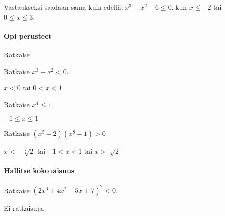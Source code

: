 Vastaukseksi saadaan sama kuin edellä: $x^3-x^2-6 \leq 0$, kun $x\leq -2$ tai $0\leq x \leq 3$.

\begin{tehtavasivu}

\paragraph*{Opi perusteet}

\begin{tehtava}
    Ratkaise
    \begin{alakohdat}
    \end{alakohdat}
    \begin{vastaus}
        \begin{alakohdat}
        \end{alakohdat}
    \end{vastaus}
\end{tehtava}

\begin{tehtava}
    Ratkaise $x^3-x^2<0$.
    \begin{vastaus}
        $x<0$ tai $0<x<1$
    \end{vastaus}
\end{tehtava}

\begin{tehtava}
    Ratkaise $x^4 \le 1$.
    \begin{vastaus}
        $-1 \le x \le 1$
    \end{vastaus}
\end{tehtava}

\begin{tehtava}
Ratkaise $(x^5-2)(x^8-1) >0$
\begin{vastaus}
$x< -\sqrt[5]{2}$ tai $-1<x<1$ tai $x >\sqrt[5]{2}$
\end{vastaus}
\end{tehtava}

\paragraph*{Hallitse kokonaisuus}

\begin{tehtava}
    Ratkaise $(2x^3+4x^2-5x+7)^2 < 0$.
    \begin{vastaus}
        Ei ratkaisuja.
    \end{vastaus}
\end{tehtava}


\end{tehtavasivu}
